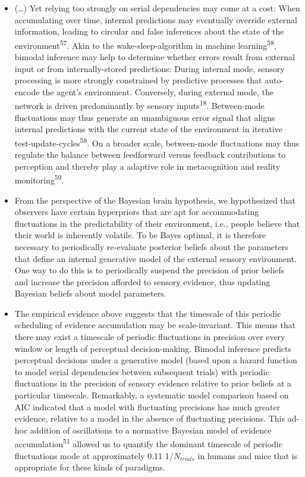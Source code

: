 \documentclass[
]{article}
\begin{document}
\begin{itemize}
\item
  (\ldots) Yet relying too strongly on serial dependencies may come at a
  cost: When accumulating over time, internal predictions may eventually
  override external information, leading to circular and false
  inferences about the state of the environment\textsuperscript{57}.
  Akin to the wake-sleep-algorithm in machine
  learning\textsuperscript{58}, bimodal inference may help to determine
  whether errors result from external input or from internally-stored
  predictions: During internal mode, sensory processing is more strongly
  constrained by predictive processes that auto-encode the agent's
  environment. Conversely, during external mode, the network is driven
  predominantly by sensory inputs\textsuperscript{18}. Between-mode
  fluctuations may thus generate an unambiguous error signal that aligns
  internal predictions with the current state of the environment in
  iterative test-update-cycles\textsuperscript{58}. On a broader scale,
  between-mode fluctuations may thus regulate the balance between
  feedforward versus feedback contributions to perception and thereby
  play a adaptive role in metacognition and reality
  monitoring\textsuperscript{59}.
\item
  From the perspective of the Bayesian brain hypothesis, we hypothesized
  that observers have certain hyperpriors that are apt for accommodating
  fluctuations in the predictability of their environment, i.e., people
  believe that their world is inherently volatile. To be Bayes optimal,
  it is therefore necessary to periodically re-evaluate posterior
  beliefs about the parameters that define an internal generative model
  of the external sensory environment. One way to do this is to
  periodically suspend the precision of prior beliefs and increase the
  precision afforded to sensory evidence, thus updating Bayesian beliefs
  about model parameters.
\item
  The empirical evidence above suggests that the timescale of this
  periodic scheduling of evidence accumulation may be scale-invariant.
  This means that there may exist a timescale of periodic fluctuations
  in precision over every window or length of perceptual
  decision-making. Bimodal inference predicts perceptual decisions under
  a generative model (based upon a hazard function to model serial
  dependencies between subsequent trials) with periodic fluctuations in
  the precision of sensory evidence relative to prior beliefs at a
  particular timescale. Remarkably, a systematic model comparison based
  on AIC indicated that a model with fluctuating precisions has much
  greater evidence, relative to a model in the absence of fluctuating
  precisions. This ad-hoc addition of oscillations to a normative
  Bayesian model of evidence accumulation\textsuperscript{51} allowed us
  to quantify the dominant timescale of periodic fluctuations mode at
  approximately 0.11 1/\(N_{trials}\) in humans and mice that is
  appropriate for these kinds of paradigms.
\end{itemize}
\end{document}
